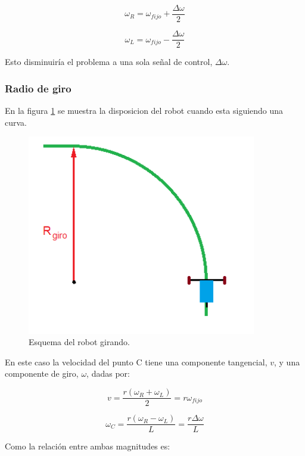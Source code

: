 \documentclass[10pt,conference,a4paper,onecolumn]{article}%
\begin{document}
\begin{equation*}
\omega _R = \omega _{fijo} + \frac{\Delta \omega}{2} 
\end{equation*}

\begin{equation*}
\omega _L = \omega _{fijo} -\frac{\Delta \omega}{2}
\end{equation*}

Esto disminuiría el problema a una sola señal de control, $\Delta \omega$.

\subsubsection{Radio de giro}
En la figura \ref{fig:girando} se muestra la disposicion del robot cuando esta siguiendo una curva.
\begin{figure}[h]
\centering
\includegraphics[width=10cm]{./imagenes/carrito_girando.png}
\caption{Esquema del robot girando.}
\label{fig:girando}
\end{figure}
En este caso la velocidad del punto C tiene una componente tangencial, $v$, y una componente de giro, $\omega$, dadas por: 

\begin{equation}
v =\frac{r(\omega _R + \omega _L) }{2}=r \omega_{fijo}
\label{eq:v_tan}
\end{equation}

\begin{equation}
\omega_{C} =\frac{r(\omega _R - \omega _L) }{L}= \frac{  r \Delta \omega} {L}
\label{eq:omegac}
\end{equation}

Como la relación entre ambas magnitudes es:
\end{document}
